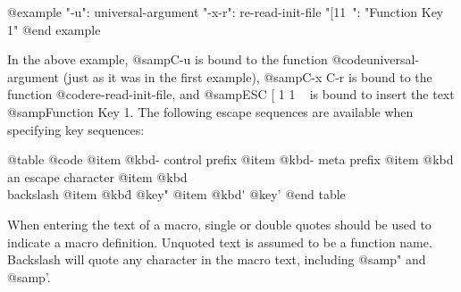 @example
"\C-u": universal-argument
"\C-x\C-r": re-read-init-file
"\e[11~": "Function Key 1"
@end example

In the above example, @samp{C-u} is bound to the function
@code{universal-argument} (just as it was in the first example),
@samp{C-x C-r} is bound to the function @code{re-read-init-file}, and
@samp{ESC [ 1 1 ~} is bound to insert the text @samp{Function Key 1}.
The following escape sequences are available when specifying key
sequences:

@table @code
@item @kbd{\C-}
control prefix
@item @kbd{\M-}
meta prefix
@item @kbd{\e}
an escape character
@item @kbd{\\}
backslash
@item @kbd{\"}
@key{"}
@item @kbd{\'}
@key{'}
@end table

When entering the text of a macro, single or double quotes should
be used to indicate a macro definition.  Unquoted text
is assumed to be a function name.  Backslash
will quote any character in the macro text, including @samp{"}
and @samp{'}.
